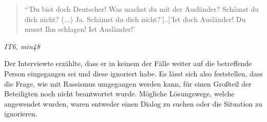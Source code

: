 \begin{quote}
    ``'Du bist doch Deutscher! Was machst du mit der Ausländer? Schämst du dich nicht? (...) Ja. Schämst du dich nicht?'[..]'Ist doch Ausländer! Du musst Ihn schlagen! Ist Ausländer!'
\end{quote}
\centerline{\textit{IT6, min48}}
Der Interviewte erzählte, dass er in keinem der Fälle weiter auf die betreffende Person eingegangen sei und diese ignoriert habe.\newline
Es lässt sich also feststellen, dass die Frage, wie mit Rassismus umgegangen werden kann, für einen Großteil der Beteiligten noch nicht beantwortet wurde. Mögliche Lösungswege, welche angewendet wurden, waren entweder einen Dialog zu suchen oder die Situation zu ignorieren.

    
    
        
        
